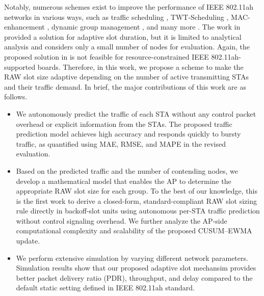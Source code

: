 \documentclass[journal]{IEEEtran}
\newcommand{\rev}[1]{{\color{blue}#1}}
\begin{document}
Notably, numerous schemes exist to improve the performance of IEEE 802.11ah networks in various ways, such as traffic scheduling \cite{9037271}, TWT-Scheduling \cite{Busacca2026TWT},  MAC-enhancement \cite{9512279}, dynamic group management \cite{Chang2019TrafficAware}, and many more \cite{TIAN2021103036, 9512279}. %
The work in \cite{10067238} provided a solution for adaptive slot duration, but it is limited to analytical analysis and considers only a small number of nodes for evaluation. Again, the proposed solution in \cite{11165035} is not feasible for resource-constrained IEEE 802.11ah-supported boards.
Therefore, in this work, we \rev{propose} a scheme to make the RAW slot size adaptive depending on the number of active transmitting STAs and their traffic demand. %
In brief, the major contributions of this work are as follows.
\begin{itemize}
    \item We autonomously predict the traffic of each STA without any control packet overhead or explicit information from the STAs. The proposed traffic prediction model achieves high accuracy and responds quickly to bursty traffic, \rev{as quantified using MAE, RMSE, and MAPE in the revised evaluation}.

    \item Based on the predicted traffic and the number of contending nodes, we develop a mathematical model that enables the AP to determine the appropriate RAW slot size for each group. To the best of our knowledge, this is the first work to derive a closed-form, standard-compliant RAW slot sizing rule directly in backoff-slot units using autonomous per-STA traffic prediction without control signaling overhead. \rev{We further analyze the AP-side computational complexity and scalability of the proposed CUSUM--EWMA update.}


    \item We perform extensive simulation by varying different network parameters. Simulation results show that our proposed adaptive slot mechansim provides better packet delivery \rev{ratio} (PDR), throughput\rev{,} and delay compared to the default static setting defined in IEEE 802.11ah standard.
\end{itemize}
\end{document}
